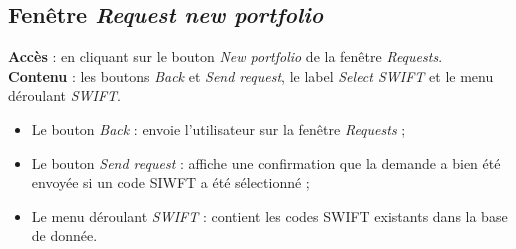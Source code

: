 \documentclass{article}
\newcommand{\navbutton}[2]{Le bouton \emph{#1} : envoie l'utilisateur sur la fenêtre \emph{#2}}
\newcommand{\access}[1]{ \noindent\textbf{Accès} : #1 \\}
\newcommand{\content}[1]{\textbf{Contenu} : #1}
\begin{document}
\subsection{Fenêtre \emph{Request new portfolio}}
\access{en cliquant sur le bouton \emph{New portfolio} de la fenêtre \emph{Requests}.}
\content{les boutons \emph{Back} et \emph{Send request}, le label \emph{Select SWIFT} et le menu déroulant \emph{SWIFT}.}
\begin{itemize}
\item \navbutton{Back}{Requests} ;
\item Le bouton \emph{Send request} : affiche une confirmation que la demande a bien été envoyée si un code SIWFT a été sélectionné ;
\item Le menu déroulant \emph{SWIFT} : contient les codes SWIFT existants dans la base de donnée.
\end{itemize}
\end{document}
